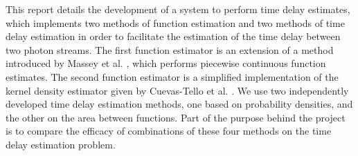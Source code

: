 \documentclass[a4paper,11pt]{article}
\begin{document}
  This report details the development of a system to perform time delay estimates,
  which implements two methods of function estimation and two methods of time
  delay estimation in order to facilitate the estimation of the time delay between
  two photon streams. The first function estimator is an extension of a method
  introduced by Massey et al. \cite{massey1996estimating}, which performs
  piecewise continuous function estimates. The second function estimator is a
  simplified implementation of the kernel density estimator given by Cuevas-Tello
  et al. \cite{cuevas2006accurate}. We use two independently developed time delay
  estimation methods, one based on probability densities, and the other on the
  area between functions. Part of the purpose behind the project is to compare the
  efficacy of combinations of these four methods on the time delay estimation
  problem.

\end{document}
